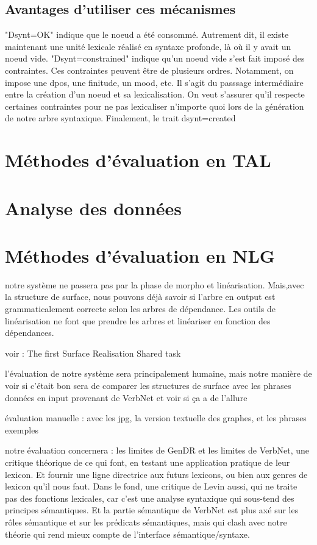 \subsection{Avantages d'utiliser ces mécanismes}

"Dsynt=OK" indique que le noeud a été consommé. Autrement dit, il existe maintenant une unité lexicale réalisé en syntaxe profonde, là où il y avait un noeud vide.
"Dsynt=constrained" indique qu'un noeud vide s'est fait imposé des contraintes. Ces contraintes peuvent être de plusieurs ordres. Notamment, on impose une dpos, une finitude, un mood, etc. Il s'agit du passsage intermédiaire entre la création d'un noeud et sa lexicalisation. On veut s'assurer qu'il respecte certaines contraintes pour ne pas lexicaliser n'importe quoi lors de la génération de notre arbre syntaxique.
Finalement, le trait dsynt=created 


\section{Méthodes d'évaluation en TAL}

\section{Analyse des données}


\section{Méthodes d'évaluation en NLG}

notre système ne passera pas par la phase de morpho et linéarisation. Mais,avec la structure de surface, nous pouvons déjà savoir si l'arbre en output est grammaticalement correcte selon les arbres de dépendance. Les outils de linéarisation ne font que prendre les arbres et linéariser en fonction des dépendances. 

voir : The first Surface Realisation Shared task

l'évaluation de notre système sera principalement humaine, mais notre manière de voir si c'était bon sera de comparer les structures de surface avec les phrases données en input provenant de VerbNet et voir si ça a de l'allure

évaluation manuelle : avec les jpg, la version textuelle des graphes, et les phrases exemples

notre évaluation concernera : les limites de GenDR et les limites de VerbNet, une critique théorique de ce qui font, en testant une application pratique de leur lexicon. Et fournir une ligne directrice aux futurs lexicons, ou bien aux genres de lexicon qu'il nous faut. Dans le fond, une critique de Levin aussi, qui ne traite pas des fonctions lexicales, car c'est une analyse syntaxique qui sous-tend des principes sémantiques. Et la partie sémantique de VerbNet est plus axé sur les rôles sémantique et sur les prédicats sémantiques, mais qui clash avec notre théorie qui rend mieux compte de l'interface sémantique/syntaxe.

